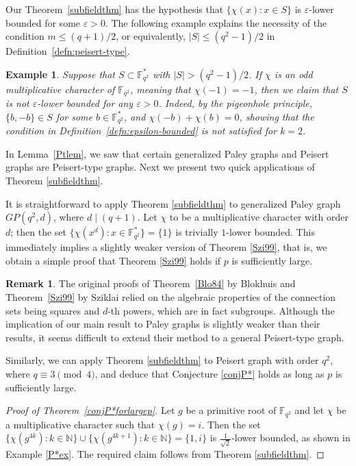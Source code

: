\documentclass[12pt,reqno]{amsart}
\newtheorem{ex}[thm]{Example}
\theoremstyle{definition}
\newtheorem{rem}[thm]{Remark}
\newcommand{\N}{\mathbb{N}}
\newcommand{\F}{\mathbb{F}}
\begin{document}
Our Theorem~\ref{subfieldthm} has the hypothesis that $\{\chi(x): x \in S\}$ is $\varepsilon$-lower bounded for some $\varepsilon>0$. The following example explains the necessity of the condition $m\leq (q+1)/2$, or equivalently, $|S|\leq (q^2-1)/2$ in Definition~\ref{defn:peisert-type}.

\begin{ex}\label{P*counter-example} \rm
Suppose that $S\subset \F_{q^2}^{\ast}$ with $|S|>(q^2-1)/2$. If $\chi$ is an odd multiplicative character of $\F_{q^2}$, meaning that $\chi(-1)=-1$, then we claim that $S$ is not $\varepsilon$-lower bounded for \emph{any} $\varepsilon>0$. Indeed, by the pigeonhole principle, $\{b, -b\}\in S$ for some $b\in \F_{q^2}^{\ast}$, and $\chi(-b)+\chi(b)=0$, showing that the condition in Definition~\ref{defn:epsilon-bounded} is not satisfied for $k=2$. 

\end{ex}



In Lemma~\ref{Ptlem}, we saw that certain generalized Paley graphs and Peisert graphs are Peisert-type graphs. Next we present two quick applications of Theorem \ref{subfieldthm}.

It is straightforward to apply Theorem \ref{subfieldthm} to generalized Paley graph $GP(q^2,d)$, where $d \mid (q+1)$. Let $\chi$ to be a multiplicative character with order $d$; then the set $\{\chi(x^d): x \in \F_{q^2}^*\}=\{1\}$ is trivially $1$-lower bounded. This immediately implies a slightly weaker version of Theorem \ref{Szi99}, that is, we obtain a simple proof that Theorem \ref{Szi99} holds if $p$ is sufficiently large. 

\begin{rem} \label{differenceinproof}
The original proofs of Theorem~\ref{Blo84} by Blokhuis and Theorem~\ref{Szi99} by Sziklai relied on the algebraic properties of the connection sets being squares and $d$-th powers, which are in fact subgroups. Although the implication of our main result to Paley graphs is slightly weaker than their results, it seems difficult to extend their method to a general Peisert-type graph. 
\end{rem}


Similarly, we can apply Theorem \ref{subfieldthm} to Peisert graph with order $q^2$, where $q \equiv 3 \pmod 4$, and deduce that Conjecture \ref{conjP*} holds as long as $p$ is sufficiently large.

\begin{proof} [Proof of Theorem~\ref{conjP*forlargep}]
Let $g$ be a primitive root of $\F_{q^2}$ and let $\chi$ be a multiplicative character such that $\chi(g)=i$. Then the set $\{\chi(g^{4k}): k \in \N\} \cup \{\chi(g^{4k+1}): k \in \N\}=\{1,i\}$ is $\frac{1}{\sqrt{2}}$-lower bounded, as shown in Example \ref{P*ex}. The required claim follows from Theorem \ref{subfieldthm}.
\end{proof}
\end{document}
